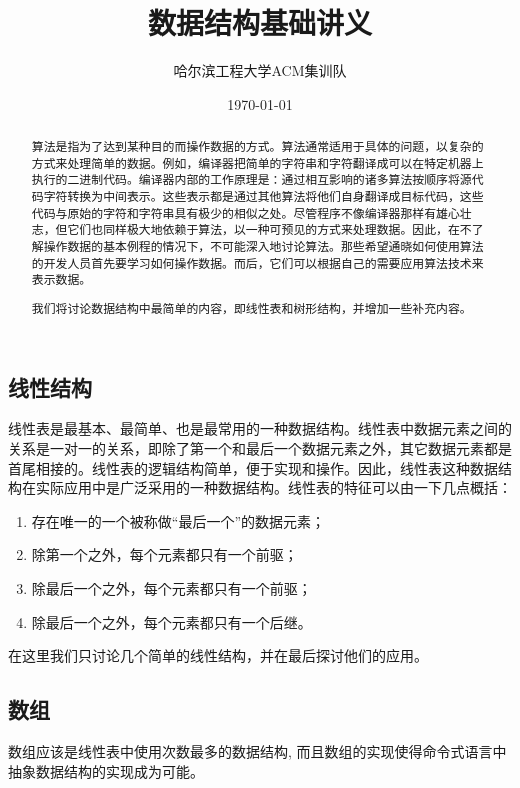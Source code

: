 \documentclass[a4paper]{article}
\title{数据结构基础讲义}
\author{哈尔滨工程大学ACM集训队}
\date{\today}
\begin{document}
\begin{CJK}{UTF8}{gbsn}
\maketitle
\newpage

\tableofcontents
\newpage
\begin{abstract}
\begin{CJK}{UTF8}{gkai}
算法是指为了达到某种目的而操作数据的方式。算法通常适用于具体的问题，以复杂的方式来处理简单的数据。例如，编译器把简单的字符串和字符翻译成可以在特定机器上执行的二进制代码。编译器内部的工作原理是：通过相互影响的诸多算法按顺序将源代码字符转换为中间表示。这些表示都是通过其他算法将他们自身翻译成目标代码，这些代码与原始的字符和字符串具有极少的相似之处。尽管程序不像编译器那样有雄心壮志，但它们也同样极大地依赖于算法，以一种可预见的方式来处理数据。因此，在不了解操作数据的基本例程的情况下，不可能深入地讨论算法。那些希望通晓如何使用算法的开发人员首先要学习如何操作数据。而后，它们可以根据自己的需要应用算法技术来表示数据。\cite{pap}

我们将讨论数据结构中最简单的内容，即线性表和树形结构，并增加一些补充内容。
\end{CJK}
\end{abstract}

\section{线性结构}
线性表是最基本、最简单、也是最常用的一种数据结构。线性表中数据元素之间的关系是一对一的关系，即除了第一个和最后一个数据元素之外，其它数据元素都是首尾相接的。线性表的逻辑结构简单，便于实现和操作。因此，线性表这种数据结构在实际应用中是广泛采用的一种数据结构。线性表的特征可以由一下几点概括：
\begin{enumerate}
\item 存在唯一的一个被称做“最后一个”的数据元素；
\item 除第一个之外，每个元素都只有一个前驱；
\item 除最后一个之外，每个元素都只有一个前驱；
\item 除最后一个之外，每个元素都只有一个后继。
\end{enumerate}
在这里我们只讨论几个简单的线性结构，并在最后探讨他们的应用。

\subsection{数组}
数组应该是线性表中使用次数最多的数据结构, 而且数组的实现使得命令式语言中抽象数据结构的实现成为可能。


\end{CJK}
\end{document}
